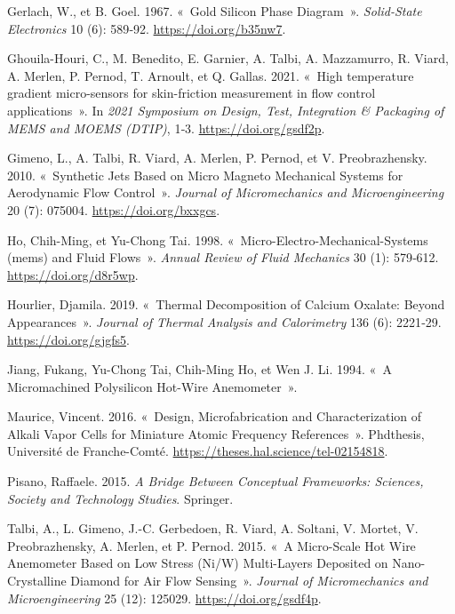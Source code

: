 \documentclass[
]{article}
\newlength{\cslhangindent}
\newenvironment{CSLReferences}[2] %
 {\begin{list}{}{%
  \setlength{\itemindent}{0pt}
  \setlength{\leftmargin}{0pt}
  \setlength{\parsep}{0pt}
  \ifodd #1
   \setlength{\leftmargin}{\cslhangindent}
   \setlength{\itemindent}{-1\cslhangindent}
  \fi
  \setlength{\itemsep}{#2\baselineskip}}}
 {\end{list}}
\begin{document}
\begin{CSLReferences}{1}{0}
Gerlach, W., et B. Goel. 1967. {«~Gold Silicon Phase Diagram~»}.
\emph{Solid-State Electronics} 10 (6): 589‑92.
\url{https://doi.org/b35nw7}.

Ghouila-Houri, C., M. Benedito, E. Garnier, A. Talbi, A. Mazzamurro, R.
Viard, A. Merlen, P. Pernod, T. Arnoult, et Q. Gallas. 2021. {«~High
temperature gradient micro-sensors for skin-friction measurement in flow
control applications~»}. In \emph{2021 Symposium on Design, Test,
Integration \& Packaging of MEMS and MOEMS (DTIP)}, 1‑3.
\url{https://doi.org/gsdf2p}.

Gimeno, L., A. Talbi, R. Viard, A. Merlen, P. Pernod, et V.
Preobrazhensky. 2010. {«~Synthetic Jets Based on Micro Magneto
Mechanical Systems for Aerodynamic Flow Control~»}. \emph{Journal of
Micromechanics and Microengineering} 20 (7): 075004.
\url{https://doi.org/bxxgcs}.

Ho, Chih-Ming, et Yu-Chong Tai. 1998.
{«~Micro-Electro-Mechanical-Systems (mems) and Fluid Flows~»}.
\emph{Annual Review of Fluid Mechanics} 30 (1): 579‑612.
\url{https://doi.org/d8r5wp}.

Hourlier, Djamila. 2019. {«~Thermal Decomposition of Calcium Oxalate:
Beyond Appearances~»}. \emph{Journal of Thermal Analysis and
Calorimetry} 136 (6): 2221‑29. \url{https://doi.org/gjgfs5}.

Jiang, Fukang, Yu-Chong Tai, Chih-Ming Ho, et Wen J. Li. 1994. {«~A
Micromachined Polysilicon Hot-Wire Anemometer~»}.

Maurice, Vincent. 2016. {«~Design, Microfabrication and Characterization
of Alkali Vapor Cells for Miniature Atomic Frequency References~»}.
Phdthesis, Université de Franche-Comté.
\url{https://theses.hal.science/tel-02154818}.

Pisano, Raffaele. 2015. \emph{A Bridge Between Conceptual Frameworks:
Sciences, Society and Technology Studies}. Springer.

Talbi, A., L. Gimeno, J.-C. Gerbedoen, R. Viard, A. Soltani, V. Mortet,
V. Preobrazhensky, A. Merlen, et P. Pernod. 2015. {«~A Micro-Scale Hot
Wire Anemometer Based on Low Stress (Ni/W) Multi-Layers Deposited on
Nano-Crystalline Diamond for Air Flow Sensing~»}. \emph{Journal of
Micromechanics and Microengineering} 25 (12): 125029.
\url{https://doi.org/gsdf4p}.


\end{CSLReferences}
\end{document}
